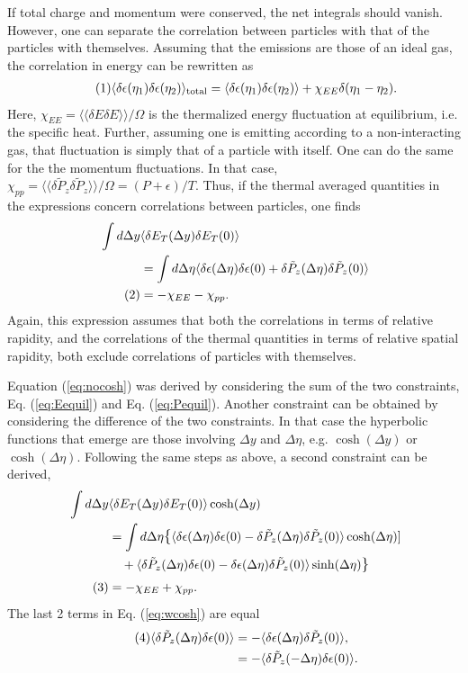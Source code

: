 \documentclass[12pt]{article}
\numberwithin{equation}{section}
\numberwithin{figure}{section}
\newcommand\eqnumber{\addtocounter{equation}{1}\tag{\theequation}}
\begin{document}
If total charge and momentum were conserved, the net integrals should vanish. However, one can separate the correlation between particles with that of the particles with themselves. Assuming that the emissions are those of an ideal gas, the correlation in energy can be rewritten as
\begin{align*}\eqnumber
\langle \delta\epsilon(\eta_1)\delta\epsilon(\eta_2)\rangle_{\rm total}
=\langle \delta\epsilon(\eta_1)\delta\epsilon(\eta_2)\rangle+\chi_{EE}\delta(\eta_1-\eta_2).
\end{align*}
Here, $\chi_{EE}=\langle\langle \delta E\delta E\rangle\rangle/\Omega$ is the thermalized energy fluctuation at equilibrium, i.e. the specific heat. Further, assuming one is emitting according to a non-interacting gas, that fluctuation is simply that of a particle with itself. One can do the same for the the momentum fluctuations. In that case, $\chi_{pp}=\langle\langle \delta \tilde{P}_z\delta \tilde{P}_z\rangle\rangle/\Omega=(P+\epsilon)/T$. Thus, if the thermal averaged quantities in the expressions concern correlations between particles, one finds
\begin{align*}
\int d\Delta y&\langle \delta E_T(\Delta y)\delta E_T(0)\rangle\\
&=\int d\Delta\eta\langle \delta\epsilon(\Delta\eta)\delta\epsilon(0)+\delta\tilde{P}_z(\Delta\eta)\delta\tilde{P}_z(0)\rangle\\
\eqnumber\label{eq:nocosh}
&=-\chi_{EE}-\chi_{pp}.
\end{align*}
Again, this expression assumes that both the correlations in terms of relative rapidity, and the correlations of the thermal quantities in terms of relative spatial rapidity, both exclude correlations of particles with themselves.

Equation (\ref{eq:nocosh}) was derived by considering the sum of the two constraints, Eq. (\ref{eq:Eequil}) and Eq. (\ref{eq:Pequil}). Another constraint can be obtained by considering the difference of the two constraints. In that case the hyperbolic functions that emerge are those involving $\Delta y$ and $\Delta\eta$, e.g. $\cosh(\Delta y)$ or $\cosh(\Delta\eta)$. Following the same steps as above, a second constraint can be derived,
\begin{align*}
\int d\Delta y &\langle \delta E_T(\Delta y)\delta E_T(0)\rangle\cosh(\Delta y)\\
&=\int d\Delta\eta\mathlarger{\{}\langle \delta\epsilon(\Delta\eta)\delta\epsilon(0)-\delta\tilde{P}_z(\Delta\eta)\delta\tilde{P}_z(0)\rangle\cosh(\Delta \eta)]\\
&~~~+\langle \delta\tilde{P}_z(\Delta\eta)\delta\epsilon(0)-\delta\epsilon(\Delta\eta)\delta\tilde{P}_z(0)\rangle\sinh(\Delta \eta)\mathlarger{\}}\\
\eqnumber\label{eq:wcosh}
&=-\chi_{EE}+\chi_{pp}.
\end{align*}
The last 2 terms in Eq. (\ref{eq:wcosh}) are equal
\begin{align*}\eqnumber
\langle\delta\tilde{P}_z(\Delta\eta)\delta\epsilon(0)\rangle&=
-\langle\delta\epsilon(\Delta\eta)\delta\tilde{P}_z(0)\rangle,\\
&=-\langle\delta\tilde{P}_z(-\Delta\eta)\delta\epsilon(0)\rangle.
\end{align*}
\end{document}
